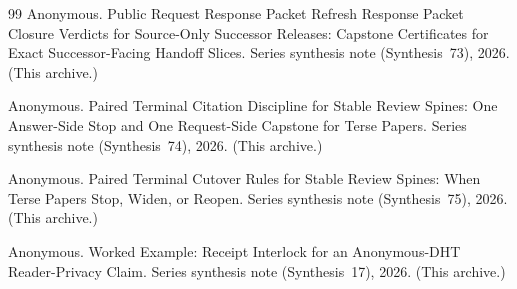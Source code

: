 \documentclass[11pt]{article}
\begin{document}
\begin{thebibliography}{99}
Anonymous.
\newblock Public Request Response Packet Refresh Response Packet Closure Verdicts for Source-Only Successor Releases: Capstone Certificates for Exact Successor-Facing Handoff Slices.
\newblock Series synthesis note (Synthesis~73), 2026. (This archive.)

Anonymous.
\newblock Paired Terminal Citation Discipline for Stable Review Spines: One Answer-Side Stop and One Request-Side Capstone for Terse Papers.
\newblock Series synthesis note (Synthesis~74), 2026. (This archive.)

Anonymous.
\newblock Paired Terminal Cutover Rules for Stable Review Spines: When Terse Papers Stop, Widen, or Reopen.
\newblock Series synthesis note (Synthesis~75), 2026. (This archive.)

Anonymous.
\newblock Worked Example: Receipt Interlock for an Anonymous-DHT Reader-Privacy Claim.
\newblock Series synthesis note (Synthesis~17), 2026. (This archive.)

\end{thebibliography}
\end{document}
